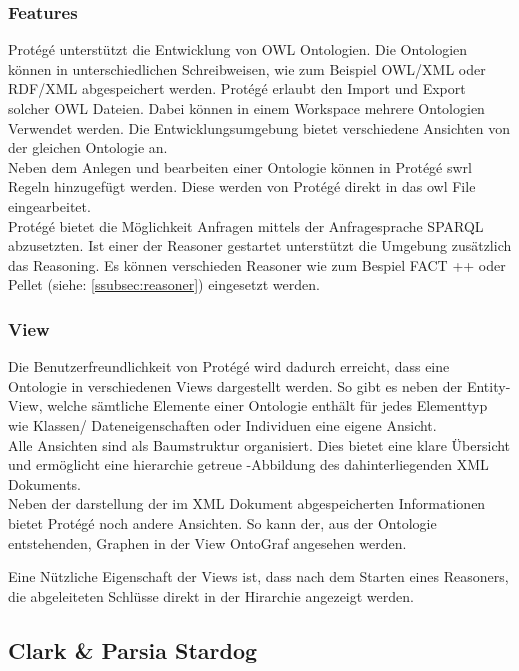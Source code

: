 \subsubsection{Features}
\label{subsubsec:protege_features}

Protégé unterstützt die Entwicklung von OWL Ontologien. Die Ontologien können in unterschiedlichen Schreibweisen, wie zum Beispiel OWL/XML oder RDF/XML abgespeichert werden. Protégé erlaubt den Import und Export solcher OWL Dateien. Dabei können in einem Workspace mehrere Ontologien Verwendet werden. Die Entwicklungsumgebung bietet verschiedene Ansichten von der gleichen Ontologie an. \\
Neben dem Anlegen und bearbeiten einer Ontologie können in Protégé  swrl Regeln hinzugefügt werden. Diese werden von Protégé direkt in das owl File eingearbeitet. \\
Protégé bietet die Möglichkeit Anfragen mittels der Anfragesprache SPARQL abzusetzten. Ist einer der Reasoner gestartet unterstützt die Umgebung zusätzlich das Reasoning. Es können verschieden Reasoner wie zum Bespiel FACT ++ oder Pellet (siehe: \ref{ssubsec:reasoner}) eingesetzt werden.\cite{protegeFeatures} 


\subsubsection{View}
\label{subsubsec:protege_view}

Die Benutzerfreundlichkeit von Protégé wird dadurch erreicht, dass eine Ontologie in verschiedenen Views dargestellt werden. So gibt es neben der Entity-View, welche sämtliche Elemente einer Ontologie enthält für jedes Elementtyp wie Klassen/ Dateneigenschaften oder Individuen eine eigene Ansicht.\\
Alle Ansichten sind als Baumstruktur organisiert. Dies bietet eine klare Übersicht und ermöglicht eine hierarchie getreue -Abbildung des dahinterliegenden XML Dokuments.\\ 
Neben der darstellung der im XML Dokument abgespeicherten Informationen bietet Protégé noch andere Ansichten. So kann der, aus der Ontologie entstehenden, Graphen in der View OntoGraf angesehen werden.\cite{protegeView}

Eine Nützliche Eigenschaft der Views ist, dass nach dem Starten eines Reasoners, die abgeleiteten Schlüsse direkt in der Hirarchie angezeigt werden.

\subsection{Clark \& Parsia Stardog}
\label{subsec:stardog}

